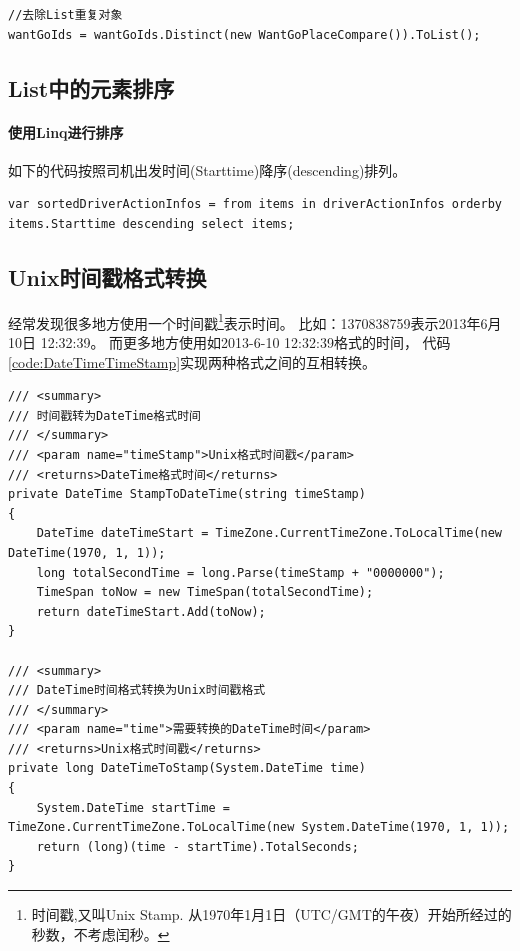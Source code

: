 \documentclass{book}
\begin{document}
\begin{lstlisting}[language={[Sharp]C}]
//去除List重复对象
wantGoIds = wantGoIds.Distinct(new WantGoPlaceCompare()).ToList();
\end{lstlisting}

\subsection{List中的元素排序}

\paragraph{使用Linq进行排序}

如下的代码按照司机出发时间(Starttime)降序(descending)排列。

\begin{lstlisting}[language={[Sharp]C}]
var sortedDriverActionInfos = from items in driverActionInfos orderby items.Starttime descending select items;
\end{lstlisting}

\subsection{Unix时间戳格式转换}

经常发现很多地方使用一个时间戳\footnote{时间戳,又叫Unix Stamp. 
从1970年1月1日（UTC/GMT的午夜）开始所经过的秒数，不考虑闰秒。}表示时间。
比如：1370838759表示2013年6月10日 12:32:39。
而更多地方使用如2013-6-10 12:32:39格式的时间， 
代码\ref{code:DateTimeTimeStamp}实现两种格式之间的互相转换。

\begin{lstlisting}[language={[Sharp]C},caption=时间戳与DateTime转换,label={code:DateTimeTimeStamp}]
/// <summary>
/// 时间戳转为DateTime格式时间
/// </summary>
/// <param name="timeStamp">Unix格式时间戳</param>
/// <returns>DateTime格式时间</returns> 
private DateTime StampToDateTime(string timeStamp)
{
    DateTime dateTimeStart = TimeZone.CurrentTimeZone.ToLocalTime(new DateTime(1970, 1, 1));
    long totalSecondTime = long.Parse(timeStamp + "0000000");
    TimeSpan toNow = new TimeSpan(totalSecondTime);
    return dateTimeStart.Add(toNow);
}

/// <summary>
/// DateTime时间格式转换为Unix时间戳格式
/// </summary>
/// <param name="time">需要转换的DateTime时间</param>
/// <returns>Unix格式时间戳</returns> 
private long DateTimeToStamp(System.DateTime time)
{
    System.DateTime startTime = TimeZone.CurrentTimeZone.ToLocalTime(new System.DateTime(1970, 1, 1));
    return (long)(time - startTime).TotalSeconds;
}
\end{lstlisting}
\end{document}
